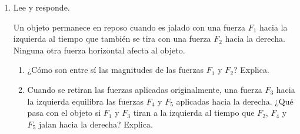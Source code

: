 \documentclass[11pt]{book}
\begin{document}
\begin{boxK}
\begin{enumerate}
    \item Lee y responde.
          \begin{boxF}
            Un objeto permanece en reposo cuando es jalado con una fuerza $F_1$
            hacia la izquierda al tiempo que también se tira con una fuerza $F_2$
            hacia la derecha. Ninguna otra fuerza horizontal afecta al objeto.
          \end{boxF}

          \begin{enumerate}
            \item ¿Cómo son entre sí las magnitudes de las fuerzas $F_1$ y $F_2$? Explica.
            \item Cuando se retiran las fuerzas aplicadas originalmente, una fuerza $F_3$
                  hacia la izquierda equilibra las fuerzas $F_4$ y $F_5$ aplicadas hacia la derecha. ¿Qué pasa con el objeto si $F_1$ y $F_3$
                  tiran a la izquierda al tiempo que $F_2$, $F_4$ y $F_5$ jalan hacia la derecha? Explica.
          \end{enumerate}
  \end{enumerate}

\end{boxK}

\newpage
\end{document}
